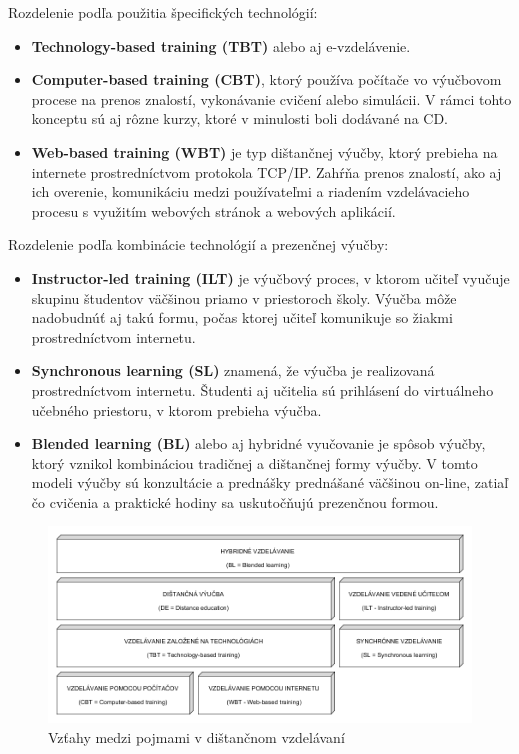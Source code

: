 \documentclass[10pt,oneside,slovak,a4paper]{article}
\begin{document}
Rozdelenie podľa použitia špecifických technológií:
\begin{itemize}
	\item \textbf{Technology-based training (TBT)} alebo aj e-vzdelávenie. %
	\item \textbf{Computer-based training (CBT)}, ktorý používa počítače vo výučbovom procese na prenos znalostí, vykonávanie cvičení alebo simulácii. V rámci tohto konceptu sú aj rôzne kurzy, ktoré v minulosti boli dodávané na CD.
	\item \textbf{Web-based training (WBT)} je typ dištančnej výučby, ktorý prebieha na internete prostredníctvom protokola TCP/IP. Zahŕňa prenos znalostí, ako aj ich overenie, komunikáciu medzi používateľmi a riadením vzdelávacieho procesu s využitím webových stránok a webových aplikácií.
\end{itemize}


Rozdelenie podľa kombinácie technológií a prezenčnej výučby:
\begin{itemize}
	\item \textbf{Instructor-led training (ILT)} je výučbový proces, v ktorom učiteľ vyučuje skupinu študentov väčšinou priamo v priestoroch školy. Výučba môže nadobudnúť aj takú formu, počas ktorej učiteľ komunikuje so žiakmi prostredníctvom internetu.
	\item \textbf{Synchronous learning (SL)} znamená, že výučba je realizovaná prostredníctvom internetu. Študenti aj učitelia sú prihlásení do virtuálneho učebného priestoru, v ktorom prebieha výučba.
	\item \textbf{Blended learning (BL)} alebo aj hybridné vyučovanie je spôsob výučby, ktorý vznikol kombináciou tradičnej a dištančnej formy výučby. V tomto modeli výučby sú konzultácie a prednášky prednášané väčšinou on-line, zatiaľ čo cvičenia a praktické hodiny sa uskutočňujú prezenčnou formou.
\end{itemize}


\begin{figure}[h]
	\centering
	\includegraphics[width=\textwidth]{Vztahy_DE.png}
	\caption{Vzťahy medzi pojmami v dištančnom vzdelávaní\cite{WiktorzakKotowski}}
	\label{Vztahy_medzi_pojmami}
\end{figure}
\end{document}
